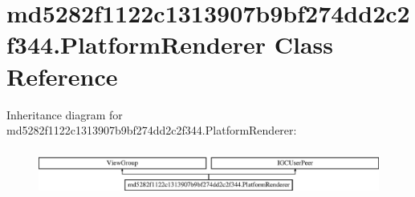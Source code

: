 \hypertarget{classmd5282f1122c1313907b9bf274dd2c2f344_1_1PlatformRenderer}{}\section{md5282f1122c1313907b9bf274dd2c2f344.\+Platform\+Renderer Class Reference}
\label{classmd5282f1122c1313907b9bf274dd2c2f344_1_1PlatformRenderer}
Inheritance diagram for md5282f1122c1313907b9bf274dd2c2f344.\+Platform\+Renderer\+:\begin{figure}[H]
\begin{center}
\leavevmode
\includegraphics[height=1.551247cm]{classmd5282f1122c1313907b9bf274dd2c2f344_1_1PlatformRenderer}
\end{center}
\end{figure}
